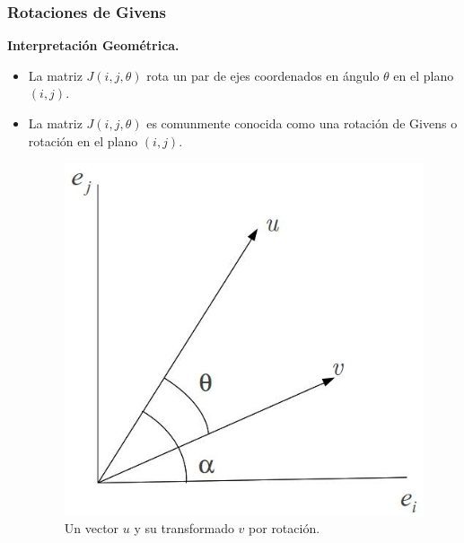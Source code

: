 \documentclass{beamer}
\begin{document}
\begin{frame}
  \frametitle{Rotaciones de Givens}
  \textbf{Interpretaci\'on Geom\'etrica.}
  \begin{itemize}
    \item<2-> La matriz $J(i,j,\theta)$ rota un par de ejes coordenados en \'angulo $\theta$ en el plano $(i,j)$. 
    \item<3-> La matriz $J(i,j,\theta)$ es comunmente conocida como una rotaci\'on de Givens o rotaci\'on en el plano $(i,j)$.
     \begin{figure}[h]
      \begin{center}
        \includegraphics[scale=0.2]{./rotacion.jpg}
      \end{center}
      \caption{Un vector $u$ y su transformado $v$ por rotaci\'on.}
      \label{rotacion}
      \end{figure}
  \end{itemize}
\end{frame}
\end{document}
